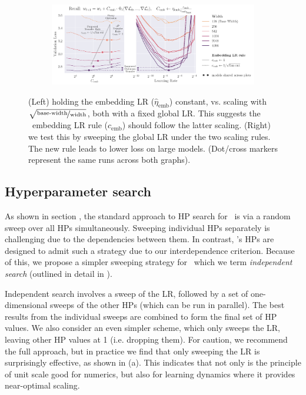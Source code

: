 \begin{figure}[t]
    \centering
    \begin{subfigure}{\textwidth}
        \centering
        \includegraphics[width=\textwidth]{arXiv/figures/fig_embeddingLR.pdf}
    \end{subfigure}
    \caption{(Left) holding the embedding LR ($\hat{\eta}_\mathrm{emb}$) constant, vs. scaling with $\sqrt{\nicefrac{\mathrm{base{\text -}width}}{\mathrm{width}}}$, both with a fixed global LR. This suggests the \mup\ embedding LR rule ($c_\mathrm{emb}$) should follow the latter scaling. (Right) we test this by sweeping the global LR under the two scaling rules. The new rule leads to lower loss on large models. (Dot/cross markers represent the same runs across both graphs).}
    \label{fig:umup:emb_lr_rule}
\end{figure}

\subsection{Hyperparameter search} \label{sec:umup_hp_search}

As shown in section , the standard approach to HP search for \mut\ is via a random sweep over all HPs simultaneously. Sweeping individual HPs separately is challenging due to the dependencies between them. In contrast, \umup's HPs are designed to admit such a strategy due to our interdependence criterion. Because of this, we propose a simpler sweeping strategy for \umup\ which we term \textit{independent search} (outlined in detail in ).

Independent search involves a sweep of the LR, followed by a set of one-dimensional sweeps of the other HPs (which can be run in parallel). The best results from the individual sweeps are combined to form the final set of HP values. We also consider an even simpler scheme, which only sweeps the LR, leaving other HP values at 1 (i.e. dropping them). For caution, we recommend the full approach, but in practice we find that only sweeping the LR is surprisingly effective, as shown in  (a). This indicates that not only is the principle of unit scale good for numerics, but also for learning dynamics where it provides near-optimal scaling.
